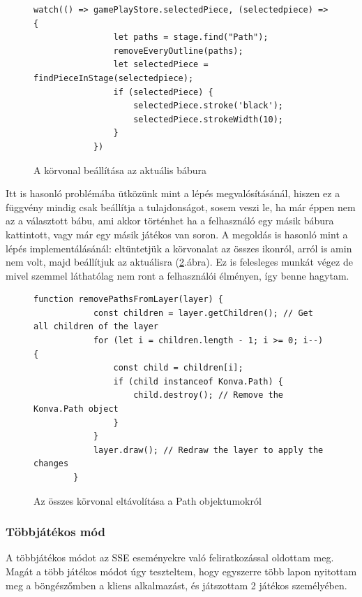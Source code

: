\documentclass[a4paper,twoside]{article}
\begin{document}
\begin{figure}
	\caption{A körvonal beállítása az aktuális bábura}
	\begin{minipage}{\textwidth}
		\begin{lstlisting}[style=javascriptStyle]
			 watch(() => gamePlayStore.selectedPiece, (selectedpiece) => {
				let paths = stage.find("Path");
				removeEveryOutline(paths);
				let selectedPiece = findPieceInStage(selectedpiece);
				if (selectedPiece) {
					selectedPiece.stroke('black');
					selectedPiece.strokeWidth(10);
				}
			})
			\end{lstlisting}
		\end{minipage}
		
		\label{addOutline}
	\end{figure}
	\FloatBarrier

 Itt is hasonló problémába ütközünk mint a lépés megvalósításánál, hiszen ez a függvény mindig csak beállítja a tulajdonságot, sosem veszi le, ha már éppen nem az a választott bábu, ami akkor történhet ha a felhasználó egy másik bábura kattintott, vagy már egy másik játékos van soron. A megoldás is hasonló mint a lépés implementálásánál: eltüntetjük a körvonalat az összes ikonról, arról is amin nem volt, majd beállítjuk az aktuálisra (\ref{removeOutline}.ábra). Ez is felesleges munkát végez de mivel szemmel láthatólag nem ront a felhasználói élményen, így benne hagytam. 
\begin{figure}
	\caption{Az összes körvonal eltávolítása a Path objektumokról}
	\begin{minipage}{\textwidth}
		\begin{lstlisting}[style=javascriptStyle]
		function removePathsFromLayer(layer) {
			const children = layer.getChildren(); // Get all children of the layer
			for (let i = children.length - 1; i >= 0; i--) {
				const child = children[i];
				if (child instanceof Konva.Path) {
					child.destroy(); // Remove the Konva.Path object
				}
			}
			layer.draw(); // Redraw the layer to apply the changes
		}
		\end{lstlisting}
	\end{minipage}
	
	\label{removeOutline}
\end{figure}




\subsubsection{Többjátékos mód}
A többjátékos módot az SSE eseményekre való feliratkozással oldottam meg. Magát a több játékos módot úgy teszteltem, hogy egyszerre több lapon nyitottam meg a böngészőmben a
kliens alkalmazást, és játszottam 2 játékos személyében. 
\end{document}
